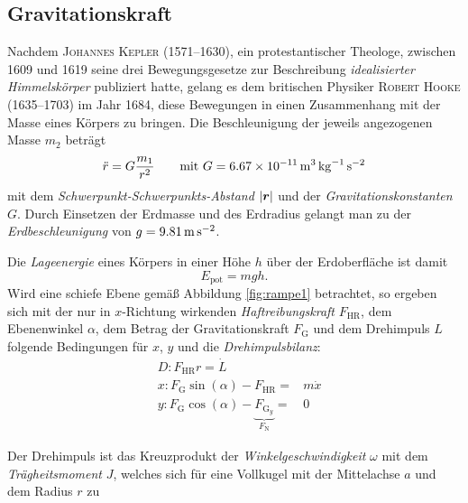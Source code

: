 \subsection{Gravitationskraft}
\label{sec:gravity}
Nachdem \textsc{Johannes Kepler} (1571--1630), ein protestantischer Theologe, zwischen 1609 und 1619 seine drei Bewegungsgesetze zur Beschreibung \textit{idealisierter Himmelskörper} publiziert hatte, gelang es dem britischen Physiker \textsc{Robert Hooke} (1635--1703) im Jahr 1684, diese Bewegungen in einen Zusammenhang mit der Masse eines Körpers zu bringen. Die Beschleunigung der jeweils angezogenen Masse $m_2$ beträgt
\begin{equation}
\label{eq:gravity1}
\ddot{r}=G\frac{m_1}{r^2}\qquad\text{mit }G=\SI{6.67E-11}{\metre\cubed\per\kilogram\per\second\squared}
\end{equation}  
mit dem \textit{Schwerpunkt-Schwerpunkts-Abstand} $\lvert\boldsymbol{r}\rvert$ und der \textit{Gravitationskonstanten} $G$. Durch Einsetzen der Erdmasse und des Erdradius gelangt man zu der \textit{Erdbeschleunigung} von $g=\SI[fraction-function=\sfrac]{9.81}{\metre\per\second\squared}$. \par
Die \textit{Lageenergie} eines Körpers in einer Höhe $h$ über der Erdoberfläche ist damit 
\begin{equation}
\label{eq:gravity2}
E_\mathrm{pot}=mgh.
\end{equation}
Wird eine schiefe Ebene gemäß Abbildung \ref{fig:rampe1} betrachtet, so ergeben sich mit der nur in $x$-Richtung wirkenden \textit{Haftreibungskraft} $F_\mathrm{HR}$, dem Ebenenwinkel $\alpha$, dem Betrag der Gravitationskraft $F_\mathrm{G}$ und dem Dreh{\-}impuls $L$ folgende Bedingungen für $x$, $y$ und die \textit{Drehimpulsbilanz}:\vspace*{-2.2cm}\vspace*{2.2cm}\newpage
\begin{equation}
\begin{alignedat}{2}
\label{eq:gravity3}
& D: F_\mathrm{HR}r=\dot{L}\\
& x: F_\mathrm{G}\sin(\alpha)-F_\mathrm{HR}=&m\dot{x}\\
& y:F_\mathrm{G}\cos(\alpha)- \underbrace{F_{\mathrm{G}_y}}_{F_\mathrm{N}}=& 0
\end{alignedat}
\end{equation}

Der Drehimpuls ist das Kreuzprodukt der \textit{Winkelgeschwindigkeit} $\omega$ mit dem \textit{Trägheitsmoment} $J$, welches sich für eine Vollkugel mit der Mittelachse $a$ und dem Radius $r$ zu
